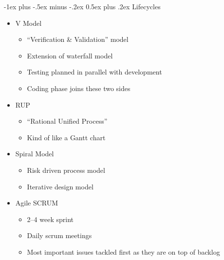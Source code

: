 \documentclass[10pt,landscape]{article}
\makeatletter
\renewcommand{\section}{\@startsection{section}{1}{0mm}%
                                {-1ex plus -.5ex minus -.2ex}%
                                {0.5ex plus .2ex}%
                                {\normalfont\large\bfseries}}
\makeatother
\begin{document}
\begin{multicols}{2}
\section{Lifecycles}
\begin{itemize}
    \setlength\itemsep{0.1em}
  \item V Model
    \begin{itemize}
        \setlength\itemsep{0.1em}
      \item ``Verification \& Validation'' model
      \item Extension of waterfall model
      \item Testing planned in parallel with development
      \item Coding phase joins these two sides
    \end{itemize}
  \item RUP
    \begin{itemize}
        \setlength\itemsep{0.1em}
      \item ``Rational Unified Process''
      \item Kind of like a Gantt chart
    \end{itemize}
  \item Spiral Model
    \begin{itemize}
        \setlength\itemsep{0.1em}
      \item Risk driven process model
      \item Iterative design model
    \end{itemize}
  \item Agile SCRUM
    \begin{itemize}
        \setlength\itemsep{0.1em}
      \item 2--4 week sprint
      \item Daily scrum meetings
      \item Most important issues tackled first as they are on top of backlog
    \end{itemize}
\end{itemize}
\end{multicols}
\end{document}
